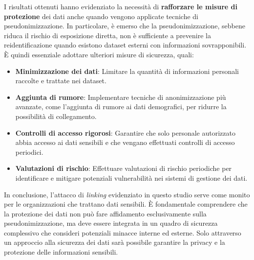 \newpage

I risultati ottenuti hanno evidenziato la necessità di \textbf{rafforzare le misure di protezione} dei dati anche quando vengono applicate tecniche di pseudonimizzazione. In particolare, è emerso che la pseudonimizzazione, sebbene riduca il rischio di esposizione diretta, non è sufficiente a prevenire la reidentificazione quando esistono dataset esterni con informazioni sovrapponibili. È quindi essenziale adottare ulteriori misure di sicurezza, quali:

\begin{itemize}
    \item \textbf{Minimizzazione dei dati}: Limitare la quantità di informazioni personali raccolte e trattate nei dataset.
    \item \textbf{Aggiunta di rumore}: Implementare tecniche di anonimizzazione più avanzate, come l'aggiunta di rumore ai dati demografici, per ridurre la possibilità di collegamento.
    \item \textbf{Controlli di accesso rigorosi}: Garantire che solo personale autorizzato abbia accesso ai dati sensibili e che vengano effettuati controlli di accesso periodici.
    \item \textbf{Valutazioni di rischio}: Effettuare valutazioni di rischio periodiche per identificare e mitigare potenziali vulnerabilità nei sistemi di gestione dei dati.
\end{itemize}

In conclusione, l'attacco di \textit{linking} evidenziato in questo studio serve come monito per le organizzazioni che trattano dati sensibili. È fondamentale comprendere che la protezione dei dati non può fare affidamento esclusivamente sulla pseudonimizzazione, ma deve essere integrata in un quadro di sicurezza complessivo che consideri potenziali minacce interne ed esterne. Solo attraverso un approccio  alla sicurezza dei dati sarà possibile garantire la privacy e la protezione delle informazioni sensibili.